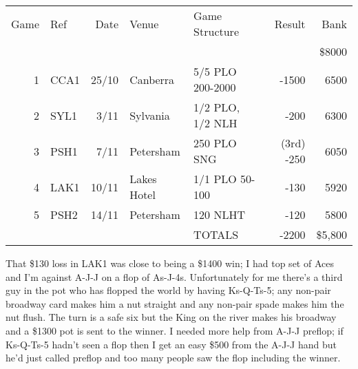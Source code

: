 \begin{tabular}{rlrllrr}
 Game & Ref & Date & Venue & Game Structure & Result & Bank \\
     &           &      &           &             &       & \$8000 \\
  1  &   CCA1    & 25/10 & Canberra & 5/5 PLO 200-2000 & -1500 & 6500 \\
  2  &   SYL1    &  3/11 & Sylvania & 1/2 PLO, 1/2 NLH &  -200 & 6300 \\
  3  &   PSH1    &  7/11 & Petersham & 250 PLO SNG & (3rd) -250 & 6050 \\
  4  &   LAK1    & 10/11 & Lakes Hotel & 1/1 PLO 50-100 &  -130 & 5920 \\
  5  &   PSH2    & 14/11 & Petersham & 120 NLHT & -120 & 5800 \\
     &           &       &           & TOTALS & -2200 & \$5,800 \\
\end{tabular}

That \$130 loss in LAK1 was close to being a \$1400 win; I had top set
of Aces and I'm against A-J-J on a flop of As-J-4s. Unfortunately for
me there's a third guy in the pot who has flopped the world by having
Ks-Q-Ts-5; any non-pair broadway card makes him a nut straight
and any non-pair spade makes him the nut flush. The turn is a safe six
but the King on the river makes his broadway and a \$1300 pot is sent
to the winner. I needed more help from A-J-J preflop; if Ks-Q-Ts-5
hadn't seen a flop then I get an easy \$500 from the A-J-J hand but
he'd just called preflop and too many people saw the flop including
the winner.
